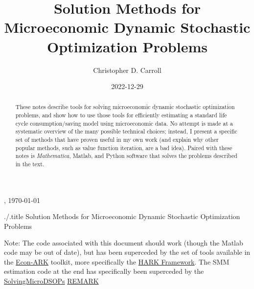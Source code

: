 \documentclass[titlepage, headings=optiontotocandhead]{\econtex}
\begin{document}
\renewcommand{\onlyinsubfile}[1]{}\renewcommand{\notinsubfile}[1]{#1}

\hfill{\tiny \jobname, \today}

\begin{verbatimwrite}{./\texname.title}
  Solution Methods for Microeconomic Dynamic Stochastic Optimization Problems
\end{verbatimwrite}

\title{Solution Methods for Microeconomic Dynamic Stochastic Optimization Problems}

\author{Christopher D. Carroll\authNum}


\date{2022-12-29}
\maketitle

\noindent  Note: The code associated with this document should work (though the Matlab code may be out of date), but has been superceded by the set of tools available in the \href{https://github.com/econ-ark/HARK}{Econ-ARK} toolkit, more specifically the \href{https://github.com/econ-ark/HARK}{HARK Framework}.  The SMM estimation code at the end has specifically been superceded by the \href{https://econ-ark.org/materials/solvingmicrodsops?launch}{SolvingMicroDSOPs} \href{https://github.com/econ-ark/REMARK}{REMARK}


\hypertarget{Abstract}{}
\begin{abstract}
  These notes describe tools for solving microeconomic dynamic stochastic optimization problems, and show how to use those tools for efficiently estimating a standard life cycle consumption/saving model using microeconomic data.  No attempt is made at a systematic overview of the many possible technical choices; instead, I present a specific set of methods that have proven useful in my own work (and explain why other popular methods, such as value function iteration, are a bad idea).  Paired with these notes is \textit{Mathematica}, Matlab, and Python software that solves the problems described in the text.
\end{abstract}
\end{document}
